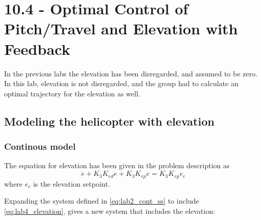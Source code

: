 \documentclass[../main.tex]{subfiles}
\begin{document}
\section{10.4 - Optimal Control of Pitch/Travel and Elevation with Feedback}
In the previous labs the elevation has been disregarded, and assumed to be zero. In this lab, elevation is not disregarded, and the group had to calculate an optimal trajectory for the elevation as well.

\subsection{Modeling the helicopter with elevation}
\subsubsection{Continous model}
The equation for elevation has been given in the problem description as
\begin{equation}\label{eq:lab4_elevation}
	\ddot{e} + K_3K_{ed}\dot{e} + K_3K_{ep}e = K_3K_{ep}e_c
\end{equation}
where $ e_c $ is the elevation setpoint.

Expanding the system defined in \cref{eq:lab2_cont_ss} to include \cref{eq:lab4_elevation}, gives a new system that includes the elevation:
\end{document}
